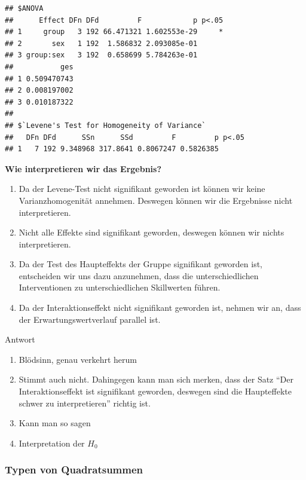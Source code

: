\documentclass[
]{book}
\begin{document}
\begin{verbatim}
## $ANOVA
##      Effect DFn DFd         F            p p<.05
## 1     group   3 192 66.471321 1.602553e-29     *
## 2       sex   1 192  1.586832 2.093085e-01      
## 3 group:sex   3 192  0.658699 5.784263e-01      
##           ges
## 1 0.509470743
## 2 0.008197002
## 3 0.010187322
## 
## $`Levene's Test for Homogeneity of Variance`
##   DFn DFd      SSn      SSd         F         p p<.05
## 1   7 192 9.348968 317.8641 0.8067247 0.5826385
\end{verbatim}

\textbf{Wie interpretieren wir das Ergebnis?}

\begin{enumerate}
\def\labelenumi{\arabic{enumi}.}
\item
  Da der Levene-Test nicht signifikant geworden ist können wir keine Varianzhomogenität annehmen. Deswegen können wir die Ergebnisse nicht interpretieren.
\item
  Nicht alle Effekte sind signifikant geworden, deswegen können wir nichts interpretieren.
\item
  Da der Test des Haupteffekts der Gruppe signifikant geworden ist, entscheiden wir uns dazu anzunehmen, dass die unterschiedlichen Interventionen zu unterschiedlichen Skillwerten führen.
\item
  Da der Interaktionseffekt nicht signifikant geworden ist, nehmen wir an, dass der Erwartungswertverlauf parallel ist.
\end{enumerate}

Antwort

\begin{enumerate}
\def\labelenumi{\arabic{enumi}.}
\item
  Blödsinn, genau verkehrt herum
\item
  Stimmt auch nicht. Dahingegen kann man sich merken, dass der Satz ``Der Interaktionseffekt ist signifikant geworden, deswegen sind die Haupteffekte schwer zu interpretieren'' richtig ist.
\item
  Kann man so sagen
\item
  Interpretation der \(H_0\)
\end{enumerate}

\hypertarget{typen-von-quadratsummen}{%
\subsubsection{Typen von Quadratsummen}\label{typen-von-quadratsummen}}
\end{document}
